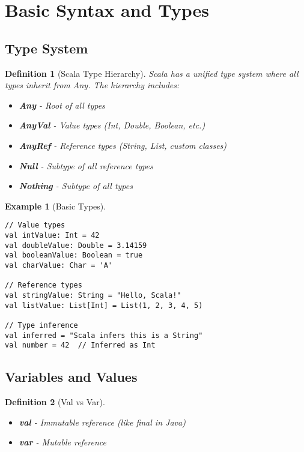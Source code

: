 \documentclass[11pt]{article}
\newtheorem{definition}{Definition}[section]
\newtheorem{example}{Example}[section]
\begin{document}
\section{Basic Syntax and Types}

\subsection{Type System}

\begin{definition}[Scala Type Hierarchy]
Scala has a unified type system where all types inherit from Any. The hierarchy includes:
\begin{itemize}
    \item \textbf{Any} - Root of all types
    \item \textbf{AnyVal} - Value types (Int, Double, Boolean, etc.)
    \item \textbf{AnyRef} - Reference types (String, List, custom classes)
    \item \textbf{Null} - Subtype of all reference types
    \item \textbf{Nothing} - Subtype of all types
\end{itemize}
\end{definition}

\begin{example}[Basic Types]
\begin{lstlisting}
// Value types
val intValue: Int = 42
val doubleValue: Double = 3.14159
val booleanValue: Boolean = true
val charValue: Char = 'A'

// Reference types
val stringValue: String = "Hello, Scala!"
val listValue: List[Int] = List(1, 2, 3, 4, 5)

// Type inference
val inferred = "Scala infers this is a String"
val number = 42  // Inferred as Int
\end{lstlisting}
\end{example}

\subsection{Variables and Values}

\begin{definition}[Val vs Var]
\begin{itemize}
    \item \textbf{val} - Immutable reference (like final in Java)
    \item \textbf{var} - Mutable reference
\end{itemize}
\end{definition}
\end{document}
